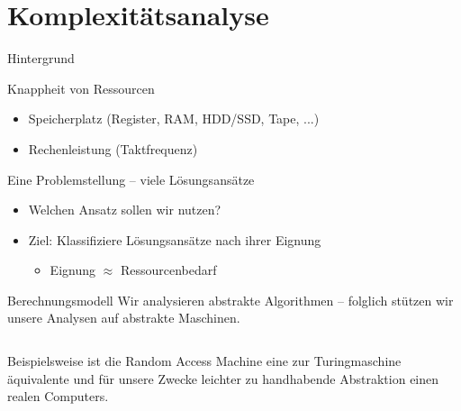 \section{Komplexit\"atsanalyse}

\begin{frame}{Hintergrund}
\begin{block}{Knappheit von Ressourcen}
    \begin{itemize}
        \item Speicherplatz (Register, RAM, HDD/SSD, Tape, ...)
        \item \alert{Rechenleistung} (Taktfrequenz)
    \end{itemize}
\end{block}

\begin{block}{Eine Problemstellung -- viele Lösungsansätze}
    \begin{itemize}
        \item Welchen Ansatz sollen wir nutzen?
        \item Ziel: Klassifiziere Lösungsansätze nach ihrer \alert{Eignung}
        \begin{itemize}
            \item Eignung $\approx$ Ressourcenbedarf
        \end{itemize}
    \end{itemize}
\end{block}
\end{frame}

\begin{frame}{Berechnungsmodell}
Wir analysieren \alert{abstrakte Algorithmen} -- folglich st\"utzen wir unsere Analysen auf \alert{abstrakte Maschinen}.

\medskip

\begin{columns}[T,onlytextwidth]
\begin{column}{0.54\textwidth}
Beispielsweise ist die \alert{Random Access Machine} eine zur \alert{Turingmaschine} \"aquivalente und f\"ur unsere Zwecke leichter zu handhabende Abstraktion einen realen Computers.
\end{column}
\begin{column}{0.4\textwidth}
\begin{tikzpicture}

\end{tikzpicture}
\end{column}
\end{columns}
\end{frame}


